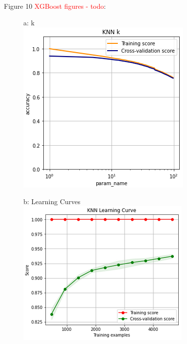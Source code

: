 \documentclass{article}
\newcommand\todo[1]{\textcolor{red}{#1}}
\begin{document}
\begin{figure}
	\centering
	Figure 10 \todo{ XGBoost figures - todo}:\\
	\begin{subfigure}{.30\textwidth}
		\centering
		a: k\\
		\includegraphics[width=\linewidth]{mnist_knn_k.png}
		
	\end{subfigure}
	\begin{subfigure}{.34\textwidth}
		\centering
		b: Learning Curves\\
		\includegraphics[width=\linewidth]{mnist_knn_learning.png}
		

\end{subfigure}
\end{figure}
\end{document}
